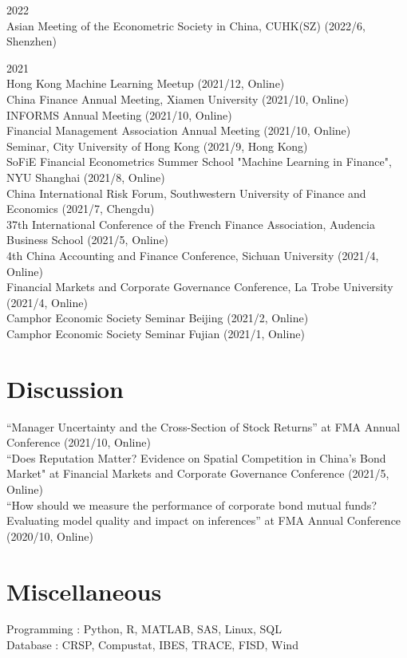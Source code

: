 \documentclass[margin]{res}
\begin{document}
\begin{resume}
2022 \\
Asian Meeting of the Econometric Society in China, CUHK(SZ) (2022/6, Shenzhen)

2021 \\
Hong Kong Machine Learning Meetup (2021/12, Online) \\
China Finance Annual Meeting, Xiamen University (2021/10, Online) \\
INFORMS Annual Meeting (2021/10, Online) \\
Financial Management Association Annual Meeting (2021/10, Online) \\
Seminar, City University of Hong Kong (2021/9, Hong Kong) \\
SoFiE Financial Econometrics Summer School "Machine Learning in Finance", NYU Shanghai (2021/8, Online) \\
China International Risk Forum, Southwestern University of Finance and Economics  (2021/7, Chengdu) \\
37th International Conference of the French Finance Association, Audencia Business School (2021/5, Online) \\
4th China Accounting and Finance Conference, Sichuan University (2021/4, Online) \\
Financial Markets and Corporate Governance Conference, La Trobe University (2021/4, Online) \\
Camphor Economic Society Seminar Beijing (2021/2, Online) \\
Camphor Economic Society Seminar Fujian (2021/1, Online)\\


\section{\sc Discussion}

``Manager Uncertainty and the Cross-Section of Stock Returns'' at FMA Annual Conference (2021/10, Online)
\\
``Does Reputation Matter? Evidence on Spatial Competition in China’s Bond Market" at Financial Markets and Corporate Governance Conference (2021/5, Online)
\\
``How should we measure the performance of corporate bond mutual funds? Evaluating model quality and impact on inferences'' at FMA Annual Conference (2020/10, Online)
\\


\section{\sc Miscellaneous}

Programming : Python, R, MATLAB, SAS, Linux, SQL
\\
Database : CRSP, Compustat, IBES, TRACE, FISD, Wind



\end{resume}
\(\)
\end{document}
